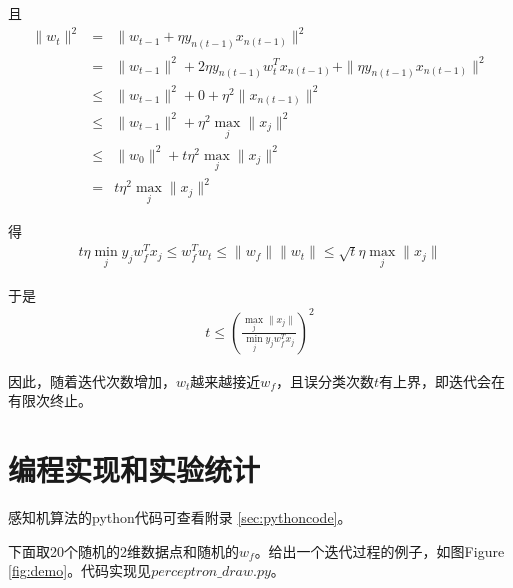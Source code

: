 \documentclass[a4paper,8pt]{article}
\begin{document}
且
\begin{eqnarray}
\|w_t\|^2 & = & \| w_{t-1} + \eta y_{n(t-1)} x_{n(t-1)} \|^2 \\
& = & \| w_{t-1}\|^2 + 2\eta y_{n(t-1)} w_t^T x_{n(t-1)}
+ \| \eta y_{n(t-1)} x_{n(t-1)} \|^2 \\
& \le & \| w_{t-1}\|^2 + 0 + \eta^2 \| x_{n(t-1)} \|^2 \\
& \le & \| w_{t-1}\|^2 + \eta^2 \max_j \| x_j \|^2 \\
& \le & \|w_0\|^2 + t \eta^2 \max_j \| x_j \|^2 \\
& = &  t \eta^2 \max_j \| x_j \|^2
\end{eqnarray}

得
\begin{eqnarray}
t \eta \min_j y_j w_f^T x_j \le w_f^T w_t \le \|w_f\| \|w_t\| \le \sqrt{t} \eta \max_j \| x_j \|
\end{eqnarray}

于是
\begin{eqnarray}
t \le \left( \frac{\max_j \| x_j \|}{\min_j y_j w_f^T x_j} \right)^2 \label{eqn:maxt}
\end{eqnarray}

因此，随着迭代次数增加，$w_t$越来越接近$w_f$，且误分类次数$t$有上界，即迭代会在有限次终止。

\section{编程实现和实验统计}

感知机算法的python代码可查看附录 \ref{sec:pythoncode}。

下面取20个随机的2维数据点和随机的$w_f$。给出一个迭代过程的例子，如图Figure \ref{fig:demo}。代码实现见$perceptron\_draw.py$。
\end{document}
